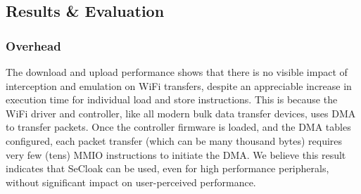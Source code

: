 \documentclass{article}
\begin{document}
\subsection{Results \& Evaluation}

\subsubsection{Overhead}

The download and upload performance shows that there is no visible impact of interception and emulation on WiFi transfers, despite an appreciable increase in execution time for individual load and store instructions. This is because the WiFi driver and controller, like all modern bulk data transfer devices, uses DMA to transfer packets. Once the controller firmware is loaded, and the DMA tables configured, each packet transfer (which can be many thousand bytes) requires very few (tens) MMIO instructions to initiate the DMA. We believe this result indicates that SeCloak can be used, even for high performance peripherals, without significant impact on user-perceived performance.
\end{document}
